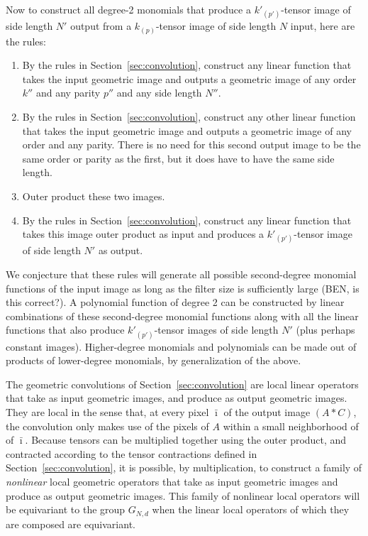 \documentclass{article}
\theoremstyle{definition}
\newcommand{\tensorname}[2]{{#1}_{(#2)}}
\newcommand{\tensor}[2]{$\tensorname{#1}{#2}$-tensor}
\newcommand{\sectionname}{Section}
\newcommand{\secref}[1]{\sectionname~\ref{#1}}
\begin{document}
Now to construct all degree-2 monomials that produce a \tensor{k'}{p'} image of side length $N'$ output from a \tensor{k}{p} image of side length $N$ input, here are the rules:
\begin{enumerate}
    \item By the rules in \secref{sec:convolution}, construct any linear function that takes the input geometric image and outputs a geometric image of any order $k''$ and any parity $p''$ and any side length $N''$.
    \item By the rules in \secref{sec:convolution}, construct any other linear function that takes the input geometric image and outputs a geometric image of any order and any parity.
    There is no need for this second output image to be the same order or parity as the first, but it does have to have the same side length.
    \item Outer product these two images.
    \item By the rules in \secref{sec:convolution}, construct any linear function that takes this image outer product as input and produces a \tensor{k'}{p'} image of side length $N'$ as output.
\end{enumerate}

We conjecture that these rules will generate all possible second-degree monomial functions of the input image as long as the filter size is sufficiently large (BEN, is this correct?). A polynomial function of degree 2 can be constructed by linear combinations of these second-degree monomial functions along with all the linear functions that also produce \tensor{k'}{p'} images of side length $N'$ (plus perhaps constant images).
Higher-degree monomials and polynomials can be made out of products of lower-degree monomials, by generalization of the above.

The geometric convolutions of \secref{sec:convolution} are local linear operators that take as input geometric images, and produce as output geometric images.
They are local in the sense that, at every pixel $\bar\imath$ of the output image $(A\ast C)$, the convolution only makes use of the pixels of $A$ within a small neighborhood of of $\bar\imath$.
Because tensors can be multiplied together using the outer product, and contracted according to the tensor contractions defined in \secref{sec:convolution}, it is possible, by multiplication, to construct a family of \emph{nonlinear} local geometric operators that take as input geometric images and produce as output geometric images.
This family of nonlinear local operators will be equivariant to the group $G_{N,d}$ when the linear local operators of which they are composed are equivariant.
\end{document}
